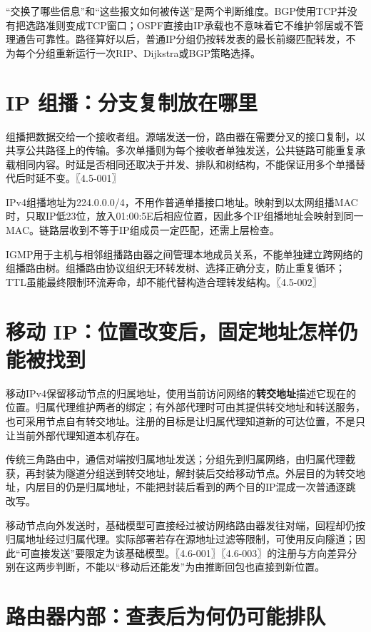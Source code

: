 ``交换了哪些信息''和``这些报文如何被传送''是两个判断维度。BGP使用TCP并没有把选路准则变成TCP窗口；OSPF直接由IP承载也不意味着它不维护邻居或不管理通告可靠性。路径算好以后，普通IP分组仍按转发表的最长前缀匹配转发，不为每个分组重新运行一次RIP、Dijkstra或BGP策略选择。

\section{IP 组播：分支复制放在哪里}\label{cn-04-19}

组播把数据交给一个接收者组。源端发送一份，路由器在需要分叉的接口复制，以共享公共路径上的传输。多次单播则为每个接收者单独发送，公共链路可能重复承载相同内容。时延是否相同还取决于并发、排队和树结构，不能保证用多个单播替代后时延不变。〖4.5-001〗

IPv4组播地址为224.0.0.0/4，不用作普通单播接口地址。映射到以太网组播MAC时，只取IP低23位，放入01:00:5E后相应位置，因此多个IP组播地址会映射到同一MAC。链路层收到不等于IP组成员一定匹配，还需上层检查。

IGMP用于主机与相邻组播路由器之间管理本地成员关系，不能单独建立跨网络的组播路由树。组播路由协议组织无环转发树、选择正确分支，防止重复循环；TTL虽能最终限制环流寿命，却不能代替构造合理转发结构。〖4.5-002〗

\section{移动 IP：位置改变后，固定地址怎样仍能被找到}\label{cn-04-20}

移动IPv4保留移动节点的归属地址，使用当前访问网络的\textbf{转交地址}描述它现在的位置。归属代理维护两者的绑定；有外部代理时可由其提供转交地址和转送服务，也可采用节点自有转交地址。注册的目标是让归属代理知道新的可达位置，不是只让当前外部代理知道本机存在。

传统三角路由中，通信对端按归属地址发送；分组先到归属网络，由归属代理截获，再封装为隧道分组送到转交地址，解封装后交给移动节点。外层目的为转交地址，内层目的仍是归属地址，不能把封装后看到的两个目的IP混成一次普通逐跳改写。

移动节点向外发送时，基础模型可直接经过被访网络路由器发往对端，回程却仍按归属地址经过归属代理。实际部署若存在源地址过滤等限制，可使用反向隧道；因此``可直接发送''要限定为该基础模型。〖4.6-001〗〖4.6-003〗的注册与方向差异分别在这两步判断，不能以``移动后还能发''为由推断回包也直接到新位置。

\section{路由器内部：查表后为何仍可能排队}\label{cn-04-21}

